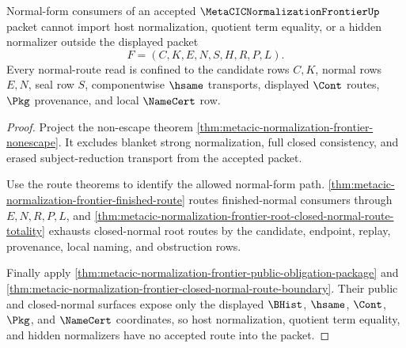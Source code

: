 \begin{theorem}
\label{thm:metacic-normalization-frontier-normal-route-nonescape}
Normal-form consumers of an accepted $\MetaCICNormalizationFrontierUp$ packet cannot import host normalization, quotient term equality, or a hidden normalizer outside the displayed packet
$$
F=(C,K,E,N,S,H,R,P,L).
$$
Every normal-route read is confined to the candidate rows $C,K$, normal rows $E,N$, seal row $S$, componentwise $\hsame$ transports, displayed $\Cont$ routes, $\Pkg$ provenance, and local $\NameCert$ row.
\end{theorem}
\begin{proof}
Project the non-escape theorem \autoref{thm:metacic-normalization-frontier-nonescape}. It excludes blanket strong normalization, full closed consistency, and erased subject-reduction transport from the accepted packet.

Use the route theorems to identify the allowed normal-form path. \autoref{thm:metacic-normalization-frontier-finished-route} routes finished-normal consumers through $E,N,R,P,L$, and \autoref{thm:metacic-normalization-frontier-root-closed-normal-route-totality} exhausts closed-normal root routes by the candidate, endpoint, replay, provenance, local naming, and obstruction rows.

Finally apply \autoref{thm:metacic-normalization-frontier-public-obligation-package} and \autoref{thm:metacic-normalization-frontier-closed-normal-route-boundary}. Their public and closed-normal surfaces expose only the displayed $\BHist$, $\hsame$, $\Cont$, $\Pkg$, and $\NameCert$ coordinates, so host normalization, quotient term equality, and hidden normalizers have no accepted route into the packet.
\end{proof}

